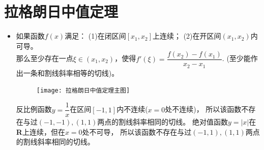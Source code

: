 \section{拉格朗日中值定理}
\begin{itemize}[leftmargin=\inteval{\myitemleftmargin}pt,itemsep=
   \inteval{\myitemitempsep}pt,topsep=\inteval{\myitemtopsep}pt]
\item 如果函数$ f(x) $满足：
(1)在闭区间$ [x_1,x_2] $上连续；
(2)在开区间$ (x_1,x_2) $内可导。\\
那么至少存在一点$ \xi\in(x_1,x_2) $，使得$ f'(\xi)=\dfrac{f(x_2)-f(x_1)}{x_2-x_1} $.
(至少能作出一条和割线斜率相等的切线)。 
\begin{figure}[h]
    \centering
    \texttt{[image: 拉格朗日中值定理主图]}
\end{figure}

反比例函数$ y=\dfrac{1}{x} $在区间$ [-1,1] $内不连续($ x=0 $处不连续)，
所以该函数不存在与过$ (-1,-1),(1,1) $两点的割线斜率相同的切线。
绝对值函数$ y=|x| $在\textbf{R}上连续，但在$ x=0 $处不可导，
所以该函数不存在与过$ (-1,1),(1,1) $两点的割线斜率相同的切线。


\end{itemize}
